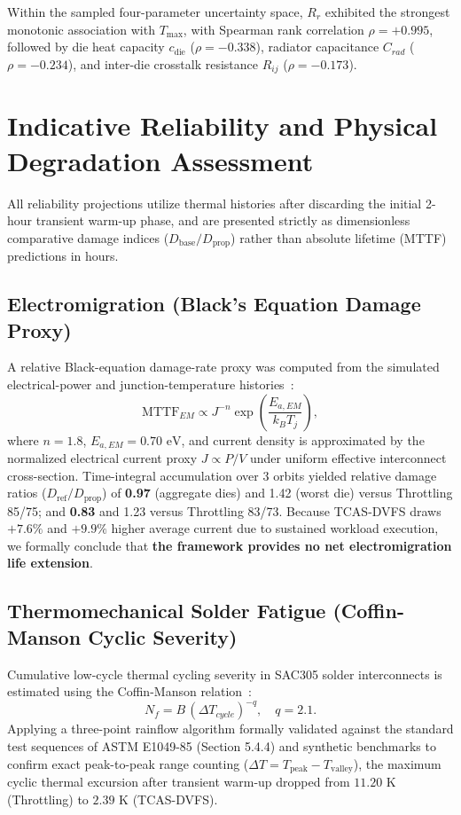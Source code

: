 \documentclass[a4paper,fleqn]{cas-dc}
\begin{document}
Within the sampled four-parameter uncertainty space, $R_r$ exhibited the strongest monotonic association with $T_{\max}$, with Spearman rank correlation $\rho = +0.995$, followed by die heat capacity $c_{\text{die}}$ ($\rho = -0.338$), radiator capacitance $C_{rad}$ ($\rho = -0.234$), and inter-die crosstalk resistance $R_{ij}$ ($\rho = -0.173$).

\section{Indicative Reliability and Physical Degradation Assessment}
\label{sec:reliability}

All reliability projections utilize thermal histories after discarding the initial 2-hour transient warm-up phase, and are presented strictly as dimensionless comparative damage indices ($D_{\text{base}}/D_{\text{prop}}$) rather than absolute lifetime (MTTF) predictions in hours.

\subsection{Electromigration (Black's Equation Damage Proxy)}
A relative Black-equation damage-rate proxy was computed from the simulated electrical-power and junction-temperature histories~\citep{black1969electromigration}:
\begin{equation}
\mathrm{MTTF}_{EM} \propto J^{-n} \exp\!\left(\frac{E_{a,EM}}{k_B T_j}\right),
\end{equation}
where $n = 1.8$, $E_{a,EM} = 0.70\text{ eV}$, and current density is approximated by the normalized electrical current proxy $J \propto P/V$ under uniform effective interconnect cross-section. Time-integral accumulation over 3 orbits yielded relative damage ratios ($D_{\text{ref}}/D_{\text{prop}}$) of \textbf{0.97} (aggregate dies) and 1.42 (worst die) versus Throttling 85/75; and \textbf{0.83} and 1.23 versus Throttling 83/73. Because TCAS-DVFS draws $+7.6\%$ and $+9.9\%$ higher average current due to sustained workload execution, we formally conclude that \textbf{the framework provides no net electromigration life extension}.

\subsection{Thermomechanical Solder Fatigue (Coffin-Manson Cyclic Severity)}
Cumulative low-cycle thermal cycling severity in SAC305 solder interconnects is estimated using the Coffin-Manson relation~\citep{manson1966fatigue}:
\begin{equation}
N_f = B\,(\Delta T_{cycle})^{-q}, \quad q = 2.1.
\end{equation}
Applying a three-point rainflow algorithm formally validated against the standard test sequences of ASTM E1049-85 (Section 5.4.4) and synthetic benchmarks to confirm exact peak-to-peak range counting ($\Delta T = T_{\text{peak}} - T_{\text{valley}}$), the maximum cyclic thermal excursion after transient warm-up dropped from $11.20\text{ K}$ (Throttling) to $2.39\text{ K}$ (TCAS-DVFS).
\end{document}
